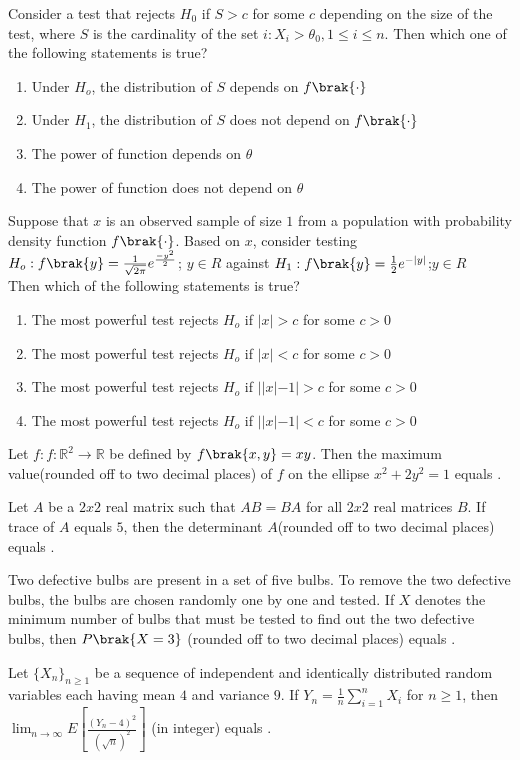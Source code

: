 Consider a test that rejects $H_{0}$ if $S > c$ for some $c$ depending on the size of the test, where $S$ is the cardinality of the set $i: X_{i} > \theta_{0}, 1 \leq i \leq n$. Then which one of the following statements is true?
    \begin{enumerate}
        \item Under $H_o$, the distribution of $S$ depends on $f\brak{\cdot}$
        \item Under $H_1$, the distribution of $S$ does not depend on $f\brak{\cdot}$
        \item The power of function depends on $\theta$
        \item The power of function does not depend on $\theta$
    \end{enumerate}
    \item Suppose that $x$ is an observed sample of size $1$ from a population with probability density function $f\brak{\cdot}$. Based on $x$, consider testing\\$H_o:f\brak{y}=\frac{1}{\sqrt{2\pi}}e^{\frac{-y^2}{2}}$; $y\in R$ against $H_1:f\brak{y}=\frac{1}{2}e^{-|y|}$;$y\in R$
    \\Then which of the following statements is true?
    \begin{enumerate}
        \item The most powerful test rejects $H_o$ if $|x|>c$ for some $c>0$
        \item The most powerful test rejects $H_o$ if $|x|<c$ for some $c>0$
        \item The most powerful test rejects $H_o$ if $||x|-1|>c$ for some $c>0$
        \item The most powerful test rejects $H_o$ if $||x|-1|<c$ for some $c>0$
    \end{enumerate}
    \item Let $f:f : \mathbb{R}^2 \to \mathbb{R}$ be defined by $f\brak{x,y}=xy$. Then the maximum value(rounded off to two decimal places) of $f$ on the ellipse $x^2+2y^2=1$ equals \underline{\hspace{1.5cm}}.
    \item Let $A$ be a $2x2$ real matrix such that $AB=BA$ for all $2x2$ real matrices $B$. If trace of $A$ equals $5$, then the determinant $A$(rounded off to two decimal places) equals \underline{\hspace{1.5cm}}.
    
    \item Two defective bulbs are present in a set of five bulbs. To remove the two defective bulbs, the bulbs are chosen randomly one by one and tested. If $X$ denotes the minimum number of bulbs that must be tested to find out the two defective bulbs, then $P\brak{X=3}$ (rounded off to two decimal places) equals \underline{\hspace{1.5cm}}.
    \item Let $\{X_n\}_{n \geq 1}$ be a sequence of independent and identically distributed random
variables each having mean $4$ and variance $9$. If  $Y_n = \frac{1}{n} \sum_{i=1}^{n} X_i$ for $n \geq 1$, then $\lim_{n \to \infty} E\left[ \frac{(Y_n - 4)^2}{(\sqrt{n})^2} \right]$ (in integer) equals  \underline{\hspace{2cm}}.

